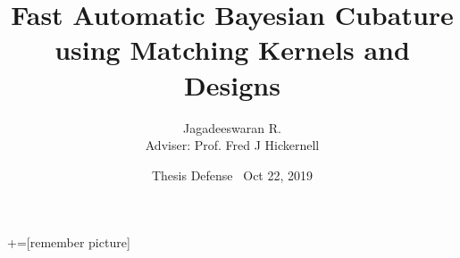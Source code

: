 \documentclass[handout, 10pt,compress,xcolor={usenames,dvipsnames}]{beamer} %
\title[]{Fast Automatic Bayesian Cubature \\ using Matching Kernels and Designs \\[1.0ex] }
\author[]{Jagadeeswaran R. \\
Adviser: Prof. Fred J Hickernell}
\institute{Department of Applied Mathematics,  Illinois Institute of Technology \\
	\href{mailto:jrathin1@iit.edu}{\url{jrathin1@iit.edu}} }
\date[]{Thesis Defense \textbullet\ Oct 22, 2019}
\begin{document}
+=[remember picture]
\everymath{\displaystyle}


\frame{\titlepage}







\iftrue
\begin{frame}{\contentsname}
    \begin{minipage}{\textwidth}
    	\vspace{-6ex}
		\linespread{1.4}
		\begin{multicols}{2}
		\tableofcontents
		\end{multicols}
    \end{minipage}
	\addtocounter{framenumber}{-1}%
\end{frame}
\fi


\iftrue
{}
\fi 

\end{document}
